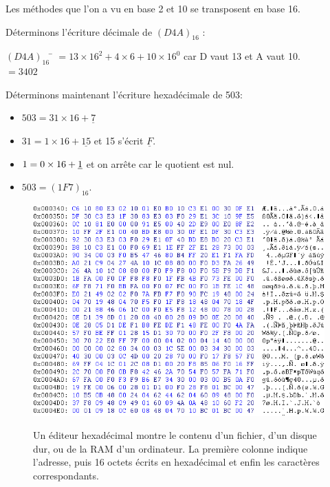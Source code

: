 Les méthodes que l'on a vu en base 2 et 10 se transposent en base 16.
\begin{methode}
    Déterminons l'écriture décimale de $(D4A)_{16}$ :
    \begin{tabbing}
        $(D4A)_{16}$  	\= $=13\times 16^2 + 4\times 6 + 10\times 16^0$	 car D vaut 13 et A vaut 10.\\
        \>	$=3402$
    \end{tabbing}
\end{methode}
\begin{methode}
    Déterminons maintenant l'écriture hexadécimale de 503:
    \begin{itemize}
        \item 	$503 = 31 \times 16 + \underline{7}$
        \item 	$31 = 1\times 16 + \underline{15}$ et 15 s'écrit $\underline{F}$.
        \item 	$1 = {\boldmath 0}\times 16 + \underline{1}$ et on arrête car le quotient est nul.
        \item 	$503=(1F7)_{16}$.
    \end{itemize}
\end{methode}
\begin{figure}[H]
    \begin{center}
        \includegraphics[width=12cm]{img/hex.png}\\
        \caption*{Un éditeur hexadécimal montre le contenu d'un fichier, d'un disque dur, ou de la RAM d'un ordinateur. La première colonne indique l'adresse,
            puis 16 octets écrits en hexadécimal et enfin les caractères correspondants.}
    \end{center}
\end{figure}
